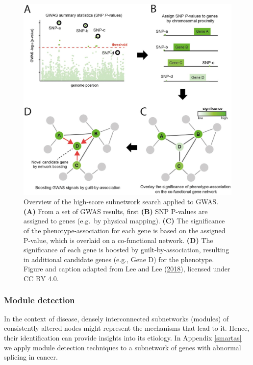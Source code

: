 \documentclass[
  11pt,
]{env/yjiao}
\begin{document}
\begin{figure}
\centering
\includegraphics{fig/dl_network_gwas.jpg}
\caption{\label{fig:network-gwas}Overview of the high-score subnetwork search applied to GWAS. \textbf{(A)} From a set of GWAS results, first \textbf{(B)} SNP P-values are assigned to genes (e.g.~by physical mapping). \textbf{(C)} The significance of the phenotype-association for each gene is based on the assigned P-value, which is overlaid on a co-functional network. \textbf{(D)} The significance of each gene is boosted by guilt-by-association, resulting in additional candidate genes (e.g., Gene D) for the phenotype. Figure and caption adapted from Lee and Lee (\protect\hyperlink{ref-lee_aragwab_2018}{2018}), licensed under CC BY 4.0.}
\end{figure}

\hypertarget{module-detection}{%
\subsubsection{Module detection}\label{module-detection}}

In the context of disease, densely interconnected subnetworks (modules) of consistently altered nodes might represent the mechanisms that lead to it. Hence, their identification can provide insights into its etiology. In Appendix \ref{smartas} we apply module detection techniques to a subnetwork of genes with abnormal splicing in cancer.
\end{document}
